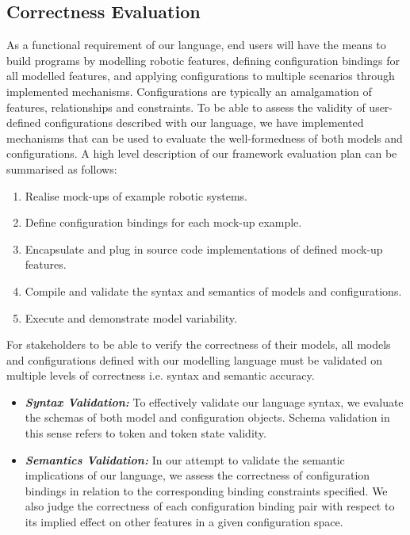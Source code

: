 \documentclass[conference]{IEEEtran}
\begin{document}
\subsection{Correctness Evaluation}
As a functional requirement of our language, end users will have the means to build programs by modelling robotic features, defining configuration bindings for all modelled features, and applying configurations to multiple scenarios through implemented mechanisms. Configurations are typically an amalgamation of features, relationships and constraints. To be able to assess the validity of user-defined configurations described with our language, we have implemented mechanisms that can be used to evaluate the well-formedness of both models and configurations. A high level description of our framework evaluation plan can be summarised as follows:
\begin{enumerate}
  \item Realise mock-ups of example robotic systems.
  \item Define configuration bindings for each mock-up example.
  \item Encapsulate and plug in source code implementations of defined mock-up features.
  \item Compile and validate the syntax and semantics of models and configurations.
  \item Execute and demonstrate model variability.
\end{enumerate}
For stakeholders to be able to verify the correctness of their models, all models and configurations defined with our modelling language must be validated on multiple levels of correctness i.e. syntax and semantic accuracy. 
\begin{itemize}[label={}]
  \item \textit{\textbf{Syntax Validation:}} To effectively validate our language syntax, we evaluate the schemas of both model and configuration objects. Schema validation in this sense refers to token and token state validity.
 
  \item \textit{\textbf{Semantics Validation:}} In our attempt to validate the semantic implications of our language, we assess the correctness of configuration bindings in relation to the corresponding binding constraints specified. We also judge the correctness of each configuration binding pair with respect to its implied effect on other features in a given configuration space.
  
\end{itemize}
\end{document}
